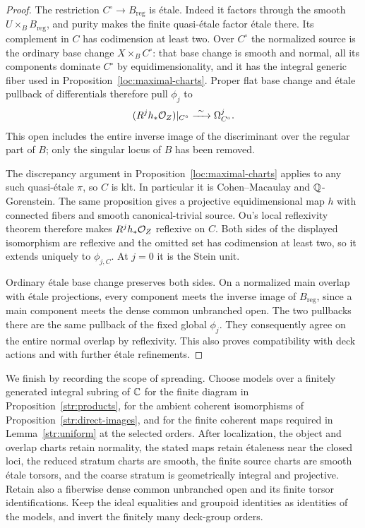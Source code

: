 \begin{proof}
The restriction $C^\circ\to B_{\mathrm{reg}}$ is \'etale.  Indeed it
factors through the smooth $U\times_BB_{\mathrm{reg}}$, and purity
makes the finite quasi-\'etale factor \'etale there.  Its complement
in $C$ has codimension at least two.  Over $C^\circ$ the normalized
source is the ordinary base change $X\times_BC^\circ$: that base change
is smooth and normal, all its components dominate $C^\circ$ by
equidimensionality, and it has the integral generic fiber used in
Proposition~\ref{loc:maximal-charts}.  Proper flat base change and
\'etale pullback of differentials therefore pull $\phi_j$ to
\[
 (R^jh_*\cO_Z)|_{C^\circ}\xrightarrow{\ \sim\ }\Omega_{C^\circ}^j.
\]
This open includes the entire inverse image of the discriminant over
the regular part of $B$; only the singular locus of $B$ has been
removed.

The discrepancy argument in Proposition~\ref{loc:maximal-charts} applies
to any such quasi-\'etale $\pi$, so $C$ is klt.  In particular it is
Cohen--Macaulay and $\mathbb Q$-Gorenstein.  The same proposition gives a
projective equidimensional map $h$ with connected fibers and smooth
canonical-trivial source.  Ou's local reflexivity theorem
\cite[Theorem~1.3]{Ou2019} therefore makes $R^jh_*\mathcal O_Z$ reflexive
on $C$.  Both sides of the displayed isomorphism are reflexive and
the omitted set has codimension at least two, so it extends uniquely
to $\phi_{j,C}$.  At $j=0$ it is the Stein unit.

Ordinary \'etale base change preserves both sides.  On a normalized
main overlap with \'etale projections, every component meets the
inverse image of $B_{\mathrm{reg}}$, since a main component meets
the dense common unbranched open.  The two pullbacks there are the
same pullback of the fixed global $\phi_j$.  They consequently
agree on the entire normal overlap by reflexivity.  This also proves
compatibility with deck actions and with further \'etale refinements.
\end{proof}

We finish by recording the scope of spreading.  Choose models over a
finitely generated integral subring of $\mathbb C$ for the finite diagram in
Proposition~\ref{str:products}, for the ambient coherent isomorphisms
of Proposition~\ref{str:direct-images}, and for the finite coherent
maps required in Lemma~\ref{str:uniform} at the selected orders.
After localization, the object and overlap charts retain normality,
the stated maps retain \'etaleness near the closed loci, the reduced
stratum charts are smooth, the finite source charts are smooth \'etale
torsors, and the coarse stratum is geometrically integral and projective.
Retain also a fiberwise dense common unbranched open and its finite
torsor identifications.  Keep the ideal equalities and groupoid
identities as identities of the models, and invert the finitely many
deck-group orders.

